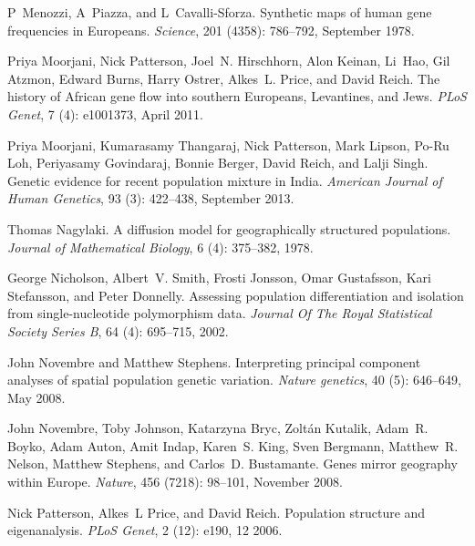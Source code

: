 \documentclass[10pt,letterpaper]{article}
\begin{document}
\begin{thebibliography}{80}
P~Menozzi, A~Piazza, and L~Cavalli-Sforza.
\newblock Synthetic maps of human gene frequencies in {Europeans}.
\newblock \emph{Science}, 201 (4358): 786--792, September
  1978.

Priya Moorjani, Nick Patterson, Joel~N. Hirschhorn, Alon Keinan, Li~Hao, Gil
  Atzmon, Edward Burns, Harry Ostrer, Alkes~L. Price, and David Reich.
\newblock The history of {African} gene flow into southern {Europeans,}
  {Levantines,} and {Jews}.
\newblock \emph{{PLoS} Genet}, 7 (4): e1001373, April 2011.

Priya Moorjani, Kumarasamy Thangaraj, Nick Patterson, Mark Lipson, Po-Ru Loh,
  Periyasamy Govindaraj, Bonnie Berger, David Reich, and Lalji Singh.
\newblock Genetic evidence for recent population mixture in {India}.
\newblock \emph{American Journal of Human Genetics}, 93 (3):
  422--438, September 2013.

Thomas Nagylaki.
\newblock A diffusion model for geographically structured populations.
\newblock \emph{Journal of Mathematical Biology}, 6 (4):
  375--382, 1978.

George Nicholson, Albert~V. Smith, Frosti Jonsson, Omar Gustafsson, Kari
  Stefansson, and Peter Donnelly.
\newblock Assessing population differentiation and isolation from
  single-nucleotide polymorphism data.
\newblock \emph{Journal Of The Royal Statistical Society Series B}, 64
  (4): 695--715, 2002.

John Novembre and Matthew Stephens.
\newblock Interpreting principal component analyses of spatial population
  genetic variation.
\newblock \emph{Nature genetics}, 40 (5): 646--649, May 2008.

John Novembre, Toby Johnson, Katarzyna Bryc, Zoltán Kutalik, Adam~R. Boyko,
  Adam Auton, Amit Indap, Karen~S. King, Sven Bergmann, Matthew~R. Nelson,
  Matthew Stephens, and Carlos~D. Bustamante.
\newblock Genes mirror geography within {Europe}.
\newblock \emph{Nature}, 456 (7218): 98--101, November 2008.

Nick Patterson, Alkes~L Price, and David Reich.
\newblock Population structure and eigenanalysis.
\newblock \emph{PLoS Genet}, 2 (12): e190, 12 2006.


\end{thebibliography}
\end{document}
